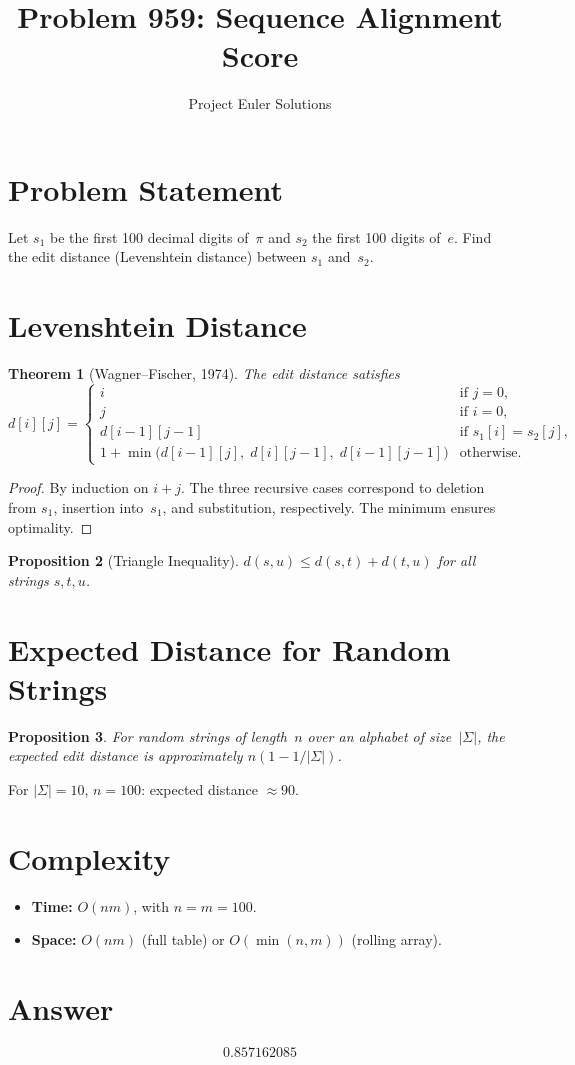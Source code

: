 \documentclass[11pt]{article}
\title{Problem 959: Sequence Alignment Score}
\author{Project Euler Solutions}
\date{}
\newtheorem{theorem}{Theorem}
\newtheorem{proposition}[theorem]{Proposition}
\begin{document}
\maketitle

\section{Problem Statement}

Let $s_1$ be the first 100 decimal digits of~$\pi$ and $s_2$ the first 100 digits of~$e$. Find the edit distance (Levenshtein distance) between $s_1$ and~$s_2$.

\section{Levenshtein Distance}

\begin{theorem}[Wagner--Fischer, 1974]
The edit distance satisfies
\[
d[i][j] = \begin{cases}
i & \text{if } j=0, \\
j & \text{if } i=0, \\
d[i{-}1][j{-}1] & \text{if } s_1[i] = s_2[j], \\
1 + \min\bigl(d[i{-}1][j],\; d[i][j{-}1],\; d[i{-}1][j{-}1]\bigr) & \text{otherwise.}
\end{cases}
\]
\end{theorem}

\begin{proof}
By induction on $i+j$. The three recursive cases correspond to deletion from $s_1$, insertion into~$s_1$, and substitution, respectively. The minimum ensures optimality.
\end{proof}

\begin{proposition}[Triangle Inequality]
$d(s,u) \le d(s,t) + d(t,u)$ for all strings $s,t,u$.
\end{proposition}

\section{Expected Distance for Random Strings}

\begin{proposition}
For random strings of length~$n$ over an alphabet of size~$|\Sigma|$, the expected edit distance is approximately $n(1 - 1/|\Sigma|)$.
\end{proposition}

For $|\Sigma|=10$, $n=100$: expected distance $\approx 90$.

\section{Complexity}

\begin{itemize}
\item \textbf{Time:} $O(nm)$, with $n = m = 100$.
\item \textbf{Space:} $O(nm)$ (full table) or $O(\min(n,m))$ (rolling array).
\end{itemize}

\section{Answer}

\[
\boxed{0.857162085}
\]
\end{document}
